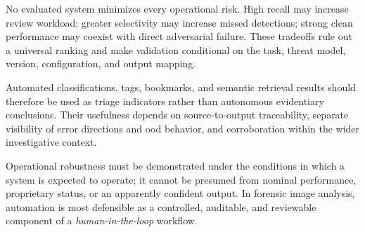 No evaluated system minimizes every operational risk. High recall may increase
review workload; greater selectivity may increase missed detections; strong
clean performance may coexist with direct adversarial failure. These tradeoffs
rule out a universal ranking and make validation conditional on the task,
threat model, version, configuration, and output mapping.

Automated classifications, tags, bookmarks, and semantic retrieval results
should therefore be used as triage indicators rather than autonomous
evidentiary conclusions. Their usefulness depends on source-to-output
traceability, separate visibility of error directions and \gls{ood} behavior,
and corroboration within the wider investigative context.

Operational robustness must be demonstrated under the conditions in which a
system is expected to operate; it cannot be presumed from nominal performance,
proprietary status, or an apparently confident output. In forensic image
analysis, automation is most defensible as a controlled, auditable, and
reviewable component of a \textit{human-in-the-loop} workflow.
